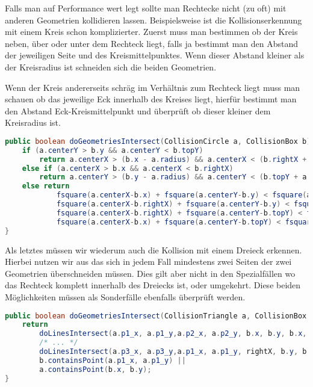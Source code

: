 Falls man auf Performance wert legt sollte man Rechtecke nicht (zu oft) mit anderen Geometrien kollidieren lassen. Beispielsweise ist die Kollisionserkennung mit einem Kreis schon komplizierter.
Zuerst muss man bestimmen ob der Kreis neben, über oder unter dem Rechteck liegt, falls ja bestimmt man den Abstand der jeweiligen Seite und des Kreismittelpunktes. Wenn dieser Abstand kleiner als der Kreisradius ist schneiden sich die beiden Geometrien.


Wenn der Kreis andererseits schräg im Verhältnis zum Rechteck liegt muss man schauen ob das jeweilige Eck innerhalb des Kreises liegt, hierfür bestimmt man den Abstand Eck-Kreismittelpunkt und überprüft ob dieser kleiner dem Kreisradius ist.


\doinline
\begin{lstlisting}[caption=Erkennen von Kollisionen (Kreis-Box), title=\hspace{0 pt}, language=java]
public boolean doGeometriesIntersect(CollisionCircle a, CollisionBox b) {
	if (a.centerY > b.y && a.centerY < b.topY)
		return a.centerX > (b.x - a.radius) && a.centerX < (b.rightX + a.radius);
	else if (a.centerX > b.x && a.centerX < b.rightX)
		return a.centerY > (b.y - a.radius) && a.centerY < (b.topY + a.radius);
	else return 
			fsquare(a.centerX-b.x) + fsquare(a.centerY-b.y) < fsquare(a.radius) ||
			fsquare(a.centerX-b.rightX) + fsquare(a.centerY-b.y) < fsquare(a.radius) ||
			fsquare(a.centerX-b.rightX) + fsquare(a.centerY-b.topY) < fsquare(a.radius) ||
			fsquare(a.centerX-b.x) + fsquare(a.centerY-b.topY) < fsquare(a.radius);
}
\end{lstlisting}

Als letztes müssen wir wiederum auch die Kollision mit einem Dreieck erkennen. Hierbei nutzen wir aus das sich in jedem Fall mindestens zwei Seiten der zwei Geometrien überschneiden müssen. Dies gilt aber nicht in den Spezialfällen wo das Rechteck komplett innerhalb des Dreiecks ist, oder umgekehrt. Diese beiden Möglichkeiten müssen als Sonderfälle ebenfalls überprüft werden.

\doinline
\begin{lstlisting}[caption=Erkennen von Kollisionen (Box-Dreieck), title=\hspace{0 pt}, language=java]
public boolean doGeometriesIntersect(CollisionTriangle a, CollisionBox b) {od
	return 
		doLinesIntersect(a.p1_x, a.p1_y,a.p2_x, a.p2_y, b.x, b.y, b.x, b.topY) ||
		/* ... */
		doLinesIntersect(a.p3_x, a.p3_y,a.p1_x, a.p1_y, rightX, b.y, b.x, b.y) ||
		b.containsPoint(a.p1_x, a.p1_y) ||
		a.containsPoint(b.x, b.y);
}
\end{lstlisting}

